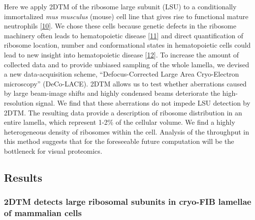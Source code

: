 \documentclass[
]{article}
\begin{document}
Here we apply 2DTM of the ribosome large subunit (LSU) to a
conditionally immortalized \emph{mus musculus} (mouse) cell line that gives
rise to functional mature neutrophils {[}\protect\hyperlink{ref-1B9Vt9eYu}{10}{]}.
We chose these cells because genetic defects in the ribosome machinery
often leads to hematopoietic disease {[}\protect\hyperlink{ref-gRoY21jY}{11}{]} and
direct quantification of ribosome location, number and conformational
states in hematopoietic cells could lead to new insight into
hematopoietic disease {[}\protect\hyperlink{ref-KAJ7221k}{12}{]}. To increase the
amount of collected data and to provide unbiased sampling of the whole
lamella, we devised a new data-acquisition scheme, ``Defocus-Corrected
Large Area Cryo-Electron microscopy'' (DeCo-LACE). 2DTM allows us to test
whether aberrations caused by large beam-image shifts and highly
condensed beams deteriorate the high-resolution signal. We find that
these aberrations do not impede LSU detection by 2DTM. The resulting
data provide a description of ribosome distribution in an entire
lamella, which represent 1-2\% of the cellular volume. We find a highly
heterogeneous density of ribosomes within the cell. Analysis of the
throughput in this method suggests that for the foreseeable future
computation will be the bottleneck for visual proteomics.

\hypertarget{results}{%
\subsection{Results}\label{results}}

\hypertarget{dtm-detects-large-ribosomal-subunits-in-cryo-fib-lamellae-of-mammalian-cells}{%
\subsubsection{2DTM detects large ribosomal subunits in cryo-FIB lamellae of mammalian cells}\label{dtm-detects-large-ribosomal-subunits-in-cryo-fib-lamellae-of-mammalian-cells}}
\end{document}
